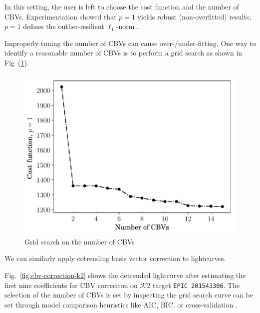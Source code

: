 \documentclass{article}
\begin{document}
In this setting, the user is left to choose the cost function and the number
of CBVs. Experimentation showed that $p=1$ yields robust (non-overfitted)
results; $p=1$ defines the outlier-resilient $\ell_1$-norm
\cite{2014sdmm.book.....I}.

Improperly tuning the number of CBVs can cause over-/under-fitting. One
way to identify a reasonable number of CBVs is to perform a grid search
as shown in Fig~(\ref{fig:cbv-grid-search}).

\begin{figure}[!htb]
    \centering
    \includegraphics[scale=.5]{figs/cbv-grid-search.pdf}
    \caption{Grid search on the number of CBVs}
    \label{fig:cbv-grid-search}
\end{figure}

We can similarly apply cotrending basis vector correction to
 lightcurves.

Fig.~\ref{fig:cbv-correction-k2} shows the detrended lightcurve after estimating
the first nine coefficients for CBV correciton on $\mathcal{K}\mathit{2}$ target
 \texttt{EPIC 201543306}. The selection of the number of CBVs is set by inspecting the
grid search curve can be set through model comparison heuristics like AIC, BIC,
or cross-validation \cite{2014sdmm.book.....I}.

\end{document}
